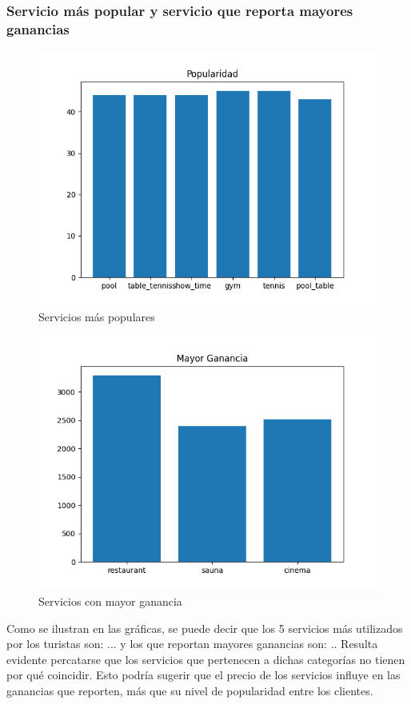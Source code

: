 \documentclass[12pt,a4paper]{article} \usepackage[spanish]{babel} \usepackage{graphicx} \usepackage{amsmath} \usepackage{amsfonts} \usepackage{amssymb} \usepackage{float} \usepackage{geometry}
\begin{document}
\subsubsection{Servicio más popular y servicio que reporta mayores ganancias}
\begin{figure}[H] \centering \includegraphics[width=\textwidth]{Popularidad serv} \caption{Servicios más populares} \label{fig:etiqueta} \end{figure}
\begin{figure}[H] \centering \includegraphics[width=\textwidth]{Mayor Ganancia} \caption{Servicios con mayor ganancia} \label{fig:etiqueta} \end{figure}
Como se ilustran en las gráficas, se puede decir que los 5 servicios más utilizados por los turistas son: ... y los que reportan mayores ganancias son: .. Resulta evidente percatarse que los servicios que pertenecen a dichas categorías no tienen por qué coincidir. Esto podría sugerir que el precio de los servicios influye en las ganancias que reporten, más que su nivel de popularidad entre los clientes.
\end{document}
